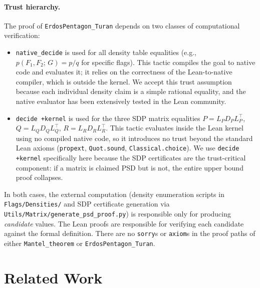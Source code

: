 \documentclass{article}
\newcommand{\den}[2]{p(#1;\,#2)}
\newcommand{\lean}[1]{\texttt{#1}}
\begin{document}
\paragraph{Trust hierarchy.}
The proof of \lean{ErdosPentagon\_Turan} depends on two classes of
computational verification:
\begin{itemize}
  \item \lean{native\_decide} is used for all density table equalities
    (e.g., $\den{F_1,F_2}{G} = p/q$ for specific flags).  This tactic
    compiles the goal to native code and evaluates it; it relies on the
    correctness of the Lean-to-native compiler, which is outside the kernel.
    We accept this trust assumption because each individual density claim is
    a simple rational equality, and the native evaluator has been extensively
    tested in the Lean community.

  \item \lean{decide +kernel} is used for the three SDP matrix equalities
    $P = L_P D_P L_P^\top$, $Q = L_Q D_Q L_Q^\top$, $R = L_R D_R L_R^\top$.
    This tactic evaluates inside the Lean kernel using no compiled native
    code, so it introduces no trust beyond the standard Lean axioms
    (\lean{propext}, \lean{Quot.sound}, \lean{Classical.choice}).
    We use \lean{decide +kernel} specifically here because the SDP
    certificates are the trust-critical component: if a matrix is claimed PSD
    but is not, the entire upper bound proof collapses.
\end{itemize}
In both cases, the external computation (density enumeration scripts in
\lean{Flags/Densities/} and SDP certificate generation via
\lean{Utils/Matrix/generate\_psd\_proof.py}) is responsible only for producing
\emph{candidate} values.  The Lean proofs are responsible for
verifying each candidate against the formal definition.  There are no
\lean{sorry}s or \lean{axiom}s in the proof paths of either
\lean{Mantel\_theorem} or \lean{ErdosPentagon\_Turan}.


\section{Related Work}
\label{sec:related}
\end{document}
